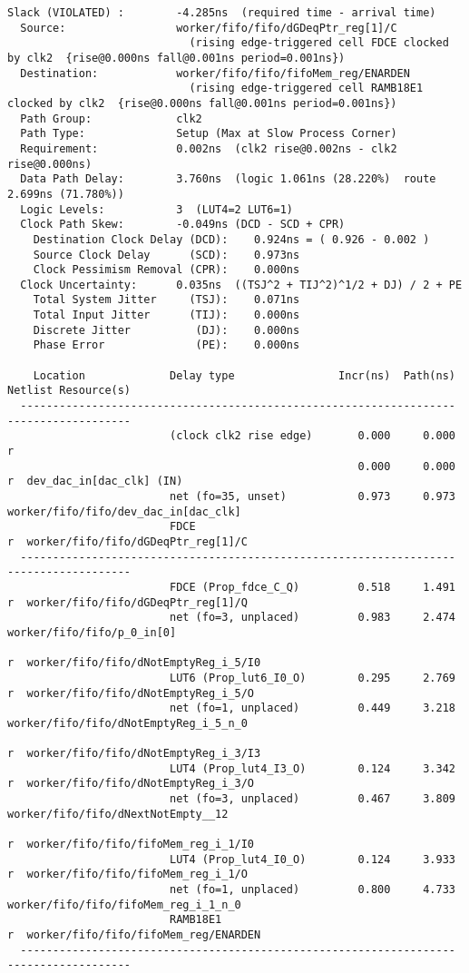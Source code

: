 \documentclass{article}
\begin{document}
\begin{lstlisting}
Slack (VIOLATED) :        -4.285ns  (required time - arrival time)
  Source:                 worker/fifo/fifo/dGDeqPtr_reg[1]/C
                            (rising edge-triggered cell FDCE clocked by clk2  {rise@0.000ns fall@0.001ns period=0.001ns})
  Destination:            worker/fifo/fifo/fifoMem_reg/ENARDEN
                            (rising edge-triggered cell RAMB18E1 clocked by clk2  {rise@0.000ns fall@0.001ns period=0.001ns})
  Path Group:             clk2
  Path Type:              Setup (Max at Slow Process Corner)
  Requirement:            0.002ns  (clk2 rise@0.002ns - clk2 rise@0.000ns)
  Data Path Delay:        3.760ns  (logic 1.061ns (28.220%)  route 2.699ns (71.780%))
  Logic Levels:           3  (LUT4=2 LUT6=1)
  Clock Path Skew:        -0.049ns (DCD - SCD + CPR)
    Destination Clock Delay (DCD):    0.924ns = ( 0.926 - 0.002 ) 
    Source Clock Delay      (SCD):    0.973ns
    Clock Pessimism Removal (CPR):    0.000ns
  Clock Uncertainty:      0.035ns  ((TSJ^2 + TIJ^2)^1/2 + DJ) / 2 + PE
    Total System Jitter     (TSJ):    0.071ns
    Total Input Jitter      (TIJ):    0.000ns
    Discrete Jitter          (DJ):    0.000ns
    Phase Error              (PE):    0.000ns

    Location             Delay type                Incr(ns)  Path(ns)    Netlist Resource(s)
  -------------------------------------------------------------------    -------------------
                         (clock clk2 rise edge)       0.000     0.000 r  
                                                      0.000     0.000 r  dev_dac_in[dac_clk] (IN)
                         net (fo=35, unset)           0.973     0.973    worker/fifo/fifo/dev_dac_in[dac_clk]
                         FDCE                                         r  worker/fifo/fifo/dGDeqPtr_reg[1]/C
  -------------------------------------------------------------------    -------------------
                         FDCE (Prop_fdce_C_Q)         0.518     1.491 r  worker/fifo/fifo/dGDeqPtr_reg[1]/Q
                         net (fo=3, unplaced)         0.983     2.474    worker/fifo/fifo/p_0_in[0]
                                                                      r  worker/fifo/fifo/dNotEmptyReg_i_5/I0
                         LUT6 (Prop_lut6_I0_O)        0.295     2.769 r  worker/fifo/fifo/dNotEmptyReg_i_5/O
                         net (fo=1, unplaced)         0.449     3.218    worker/fifo/fifo/dNotEmptyReg_i_5_n_0
                                                                      r  worker/fifo/fifo/dNotEmptyReg_i_3/I3
                         LUT4 (Prop_lut4_I3_O)        0.124     3.342 r  worker/fifo/fifo/dNotEmptyReg_i_3/O
                         net (fo=3, unplaced)         0.467     3.809    worker/fifo/fifo/dNextNotEmpty__12
                                                                      r  worker/fifo/fifo/fifoMem_reg_i_1/I0
                         LUT4 (Prop_lut4_I0_O)        0.124     3.933 r  worker/fifo/fifo/fifoMem_reg_i_1/O
                         net (fo=1, unplaced)         0.800     4.733    worker/fifo/fifo/fifoMem_reg_i_1_n_0
                         RAMB18E1                                     r  worker/fifo/fifo/fifoMem_reg/ENARDEN
  -------------------------------------------------------------------    -------------------


\end{lstlisting}
\end{document}
